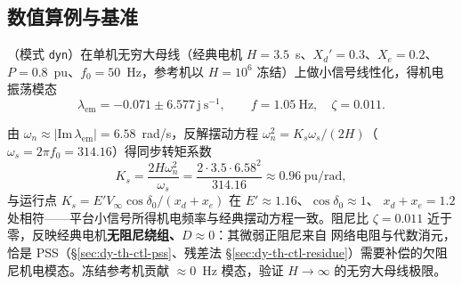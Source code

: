 \subsection{数值算例与基准}\label{sec:dy-th-ctl-numexp}

（模式 \texttt{dyn}）在单机无穷大母线（经典电机
$H{=}3.5$~s、$X_d'{=}0.3$、$X_e{=}0.2$、$P{=}0.8$~pu、$f_0{=}50$~Hz，参考机以 $H{=}10^6$
冻结）上做小信号线性化，得机电振荡模态
\begin{equation}
\lambda_{\mathrm{em}}=-0.071\pm6.577\,\mathrm j~\mathrm{s^{-1}},\qquad f=1.05~\mathrm{Hz},\quad\zeta=0.011 .
\end{equation}

\begin{example}[机电模态与摆动方程的相互印证]\label{ex:dy-th-ctl-smib}
由 $\omega_n\approx|\mathrm{Im}\,\lambda_{\mathrm{em}}|=6.58$~rad/s，反解摆动方程
$\omega_n^2=K_s\omega_s/(2H)$（$\omega_s=2\pi f_0=314.16$）得同步转矩系数
\begin{equation}
K_s=\frac{2H\omega_n^2}{\omega_s}=\frac{2\cdot3.5\cdot6.58^2}{314.16}\approx0.96~\text{pu/rad},
\end{equation}
与运行点 $K_s=E'V_\infty\cos\delta_0/(x_d{+}x_e)$ 在 $E'\!\approx\!1.16$、$\cos\delta_0\!\approx\!1$、
$x_d{+}x_e{=}1.2$ 处相符——平台小信号所得机电频率与经典摆动方程一致。阻尼比
$\zeta{=}0.011$ 近于零，反映经典电机\textbf{无阻尼绕组、$D{\approx}0$}：其微弱正阻尼来自
网络电阻与代数消元，恰是 PSS（§\ref{sec:dy-th-ctl-pss}、残差法
§\ref{sec:dy-th-ctl-residue}）需要补偿的欠阻尼机电模态。冻结参考机贡献 $\approx0$~Hz
模态，验证 $H\to\infty$ 的无穷大母线极限。
\end{example}

